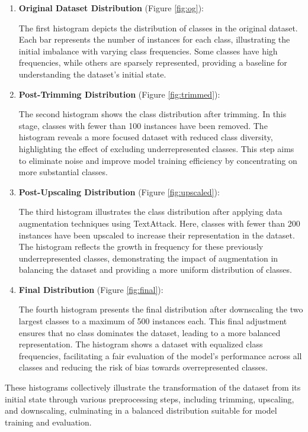\documentclass[11pt]{article}
\begin{document}
\begin{enumerate}
    \item \textbf{Original Dataset Distribution} (Figure \ref{fig:og}):
    
    The first histogram depicts the distribution of classes in the original dataset. Each bar represents the number of instances for each class, illustrating the initial imbalance with varying class frequencies. Some classes have high frequencies, while others are sparsely represented, providing a baseline for understanding the dataset's initial state.
    \item \textbf{Post-Trimming Distribution} (Figure \ref{fig:trimmed}):
    
    The second histogram shows the class distribution after trimming. In this stage, classes with fewer than 100 instances have been removed. The histogram reveals a more focused dataset with reduced class diversity, highlighting the effect of excluding underrepresented classes. This step aims to eliminate noise and improve model training efficiency by concentrating on more substantial classes.
    \item \textbf{Post-Upscaling Distribution} (Figure \ref{fig:upscaled}):
    
    The third histogram illustrates the class distribution after applying data augmentation techniques using TextAttack. Here, classes with fewer than 200 instances have been upscaled to increase their representation in the dataset. The histogram reflects the growth in frequency for these previously underrepresented classes, demonstrating the impact of augmentation in balancing the dataset and providing a more uniform distribution of classes.
    \item \textbf{Final Distribution} (Figure \ref{fig:final}):
    
    The fourth histogram presents the final distribution after downscaling the two largest classes to a maximum of 500 instances each. This final adjustment ensures that no class dominates the dataset, leading to a more balanced representation. The histogram shows a dataset with equalized class frequencies, facilitating a fair evaluation of the model's performance across all classes and reducing the risk of bias towards overrepresented classes.
\end{enumerate}

These histograms collectively illustrate the transformation of the dataset from its initial state through various preprocessing steps, including trimming, upscaling, and downscaling, culminating in a balanced distribution suitable for model training and evaluation.
\end{document}
